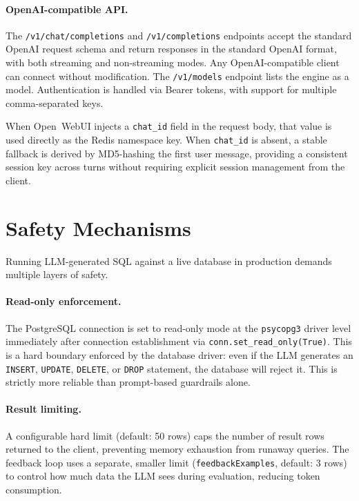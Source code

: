\documentclass{article}
\begin{document}
\paragraph{OpenAI-compatible API.} The \texttt{/v1/chat/completions} and \texttt{/v1/completions} endpoints accept the standard OpenAI request schema and return responses in the standard OpenAI format, with both streaming and non-streaming modes. Any OpenAI-compatible client can connect without modification. The \texttt{/v1/models} endpoint lists the engine as a model. Authentication is handled via Bearer tokens, with support for multiple comma-separated keys.

When Open~WebUI injects a \texttt{chat\_id} field in the request body, that value is used directly as the Redis namespace key. When \texttt{chat\_id} is absent, a stable fallback is derived by MD5-hashing the first user message, providing a consistent session key across turns without requiring explicit session management from the client.


\section{Safety Mechanisms}
\label{sec:safety}

Running LLM-generated SQL against a live database in production demands multiple layers of safety.

\paragraph{Read-only enforcement.} The PostgreSQL connection is set to read-only mode at the \texttt{psycopg3} driver level immediately after connection establishment via \texttt{conn.set\_read\_only(True)}. This is a hard boundary enforced by the database driver: even if the LLM generates an \texttt{INSERT}, \texttt{UPDATE}, \texttt{DELETE}, or \texttt{DROP} statement, the database will reject it. This is strictly more reliable than prompt-based guardrails alone.

\paragraph{Result limiting.} A configurable hard limit (default: 50 rows) caps the number of result rows returned to the client, preventing memory exhaustion from runaway queries. The feedback loop uses a separate, smaller limit (\texttt{feedbackExamples}, default: 3 rows) to control how much data the LLM sees during evaluation, reducing token consumption.
\end{document}
